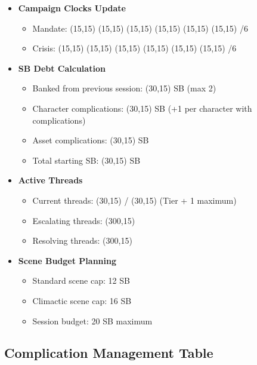 \documentclass[11pt,letterpaper]{article}
\begin{document}
\begin{itemize}
    \item \textbf{Campaign Clocks Update}
    \begin{itemize}
        \item Mandate: \framebox(15,15){} \framebox(15,15){} \framebox(15,15){} \framebox(15,15){} \framebox(15,15){} \framebox(15,15){} /6
        \item Crisis: \framebox(15,15){} \framebox(15,15){} \framebox(15,15){} \framebox(15,15){} \framebox(15,15){} \framebox(15,15){} /6
    \end{itemize}
    
    \item \textbf{SB Debt Calculation}
    \begin{itemize}
        \item Banked from previous session: \framebox(30,15){} SB (max 2)
        \item Character complications: \framebox(30,15){} SB (+1 per character with complications)
        \item Asset complications: \framebox(30,15){} SB
        \item Total starting SB: \framebox(30,15){} SB
    \end{itemize}
    
    \item \textbf{Active Threads}
    \begin{itemize}
        \item Current threads: \framebox(30,15){} / \framebox(30,15){} (Tier + 1 maximum)
        \item Escalating threads: \framebox(300,15){} 
        \item Resolving threads: \framebox(300,15){}
    \end{itemize}
    
    \item \textbf{Scene Budget Planning}
    \begin{itemize}
        \item Standard scene cap: 12 SB
        \item Climactic scene cap: 16 SB
        \item Session budget: 20 SB maximum
    \end{itemize}
\end{itemize}

\subsection{Complication Management Table}
\end{document}
